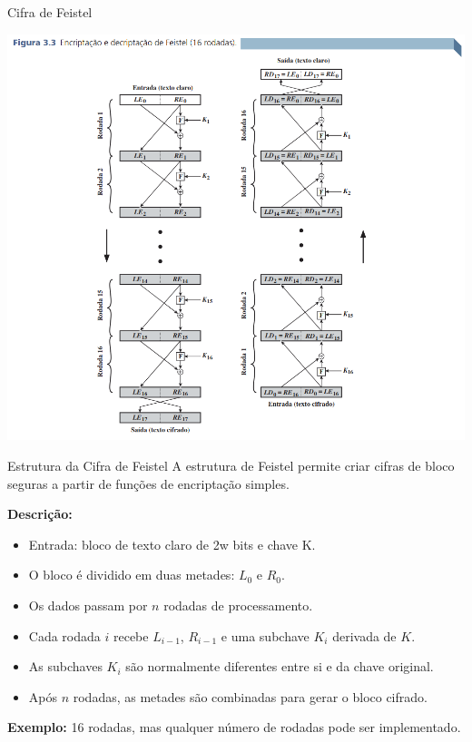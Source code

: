 \begin{frame}{Cifra de Feistel}

    \centering
    \includegraphics[width=0.6\linewidth]{Figuras/cifra-de-feistel.png}


\end{frame}

\begin{frame}{Estrutura da Cifra de Feistel}
    A estrutura de Feistel permite criar cifras de bloco seguras a partir de funções de encriptação simples.

    \medskip
    \textbf{Descrição:}
    \begin{itemize}
        \item Entrada: bloco de texto claro de 2w bits e chave K.
        \item O bloco é dividido em duas metades: $L_0$ e $R_0$.
        \item Os dados passam por $n$ rodadas de processamento.
        \item Cada rodada $i$ recebe $L_{i-1}$, $R_{i-1}$ e uma subchave $K_i$ derivada de $K$.
        \item As subchaves $K_i$ são normalmente diferentes entre si e da chave original.
        \item Após $n$ rodadas, as metades são combinadas para gerar o bloco cifrado.
    \end{itemize}

    \medskip
    \textbf{Exemplo:} 16 rodadas, mas qualquer número de rodadas pode ser implementado.
\end{frame}

